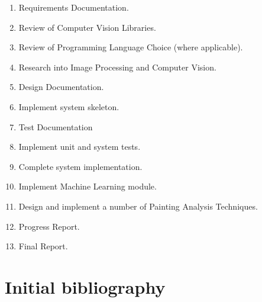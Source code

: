 \documentclass[11pt,fleqn,twoside]{article}
\begin{document}

\begin{enumerate}
\item Requirements Documentation.
\item Review of Computer Vision Libraries.
\item Review of Programming Language Choice (where applicable).
\item Research into Image Processing and Computer Vision.
\item Design Documentation.
\item Implement system skeleton.
\item Test Documentation
\item Implement unit and system tests.
\item Complete system implementation.
\item Implement Machine Learning module.
\item Design and implement a number of Painting Analysis Techniques.
\item Progress Report.
\item Final Report. 
\end{enumerate}


\section{Initial bibliography}
\end{document}
